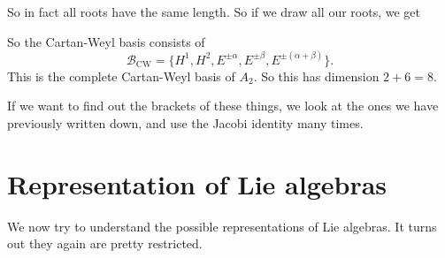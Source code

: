 \documentclass[a4paper]{article}
\begin{document}
\begin{eg}
  So in fact all roots have the same length. So if we draw all our roots, we get
  \begin{center}
  \end{center}
  So the Cartan-Weyl basis consists of
  \[
    \mathcal{B}_{\mathrm{CW}} = \{H^1, H^2, E^{\pm \alpha}, E^{\pm \beta}, E^{\pm(\alpha + \beta)}\}.
  \]
  This is the complete Cartan-Weyl basis of $A_2$. So this has dimension $2 + 6 = 8$.

  If we want to find out the brackets of these things, we look at the ones we have previously written down, and use the Jacobi identity many times.
\end{eg}

\section{Representation of Lie algebras}
We now try to understand the possible representations of Lie algebras. It turns out they again are pretty restricted.
\end{document}
